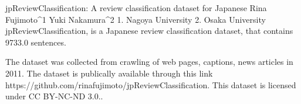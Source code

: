 
jpReviewClassification: A review classification dataset for Japanese
Rina Fujimoto^1 Yuki Nakamura^2
1. Nagoya University 2. Osaka University
jpReviewClassification, is a Japanese review classification dataset, that contains 9733.0 sentences.

The dataset was collected from crawling of web pages, captions, news articles in 2011. 
The dataset is publically available through this link https://github.com/rinafujimoto/jpReviewClassification. This dataset is licensed under CC BY-NC-ND 3.0..

